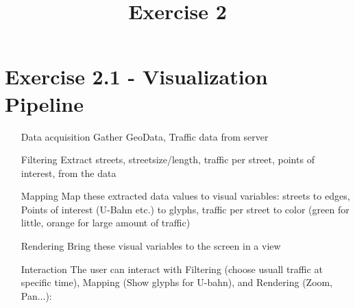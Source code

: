 \documentclass[a4paper]{article}
\date{}
\author{}
\title{Exercise 2}
\begin{document}
	
	\maketitle 
	\thispagestyle{fancy}
	
	\section*{Exercise 2.1 - Visualization Pipeline}
	\begin{itemize}
		\item[Data acquisition] Gather GeoData, Traffic data from server
		\item[Filtering] Extract streets, streetsize/length, traffic per street, points of interest, from the data 
		\item[Mapping] Map these extracted data values to visual variables: streets to edges, Points of interest (U-Bahn etc.) to glyphs, traffic per street to color (green for little, orange for large amount of traffic)
		\item[Rendering] Bring these visual variables to the screen in a view
		\item[Interaction] The user can interact with Filtering (choose usuall traffic at specific time), Mapping (Show glyphs for U-bahn), and Rendering (Zoom, Pan...): 
		
	\end{itemize}
	
\end{document}
